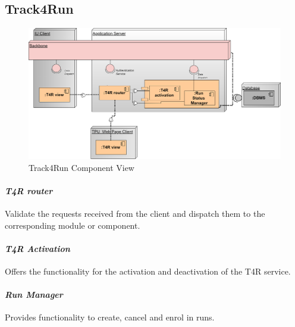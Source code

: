 \subsection{Track4Run}
\label{subsect:T4RComponentView}
\begin{figure}[H]
\caption{Track4Run Component View}
\centering
\includegraphics[width = \textwidth]{sections/architecturalDesign/T4RDiagram.png}
\end{figure}
\paragraph{\textit{T4R router}} Validate the requests received from the client and dispatch them to the corresponding module or component.
\paragraph{\textit{T4R Activation}} Offers the functionality for the activation and deactivation of the T4R service.
\paragraph{\textit{Run Manager}} Provides functionality to create, cancel and enrol in runs.
\clearpage
